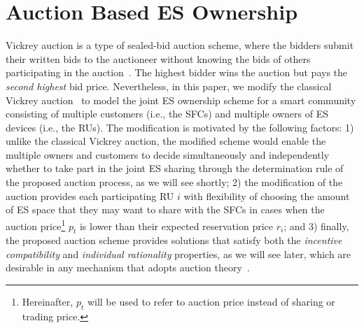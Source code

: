 \documentclass[journal,10pt]{IEEEtran}
\begin{document}
\section{Auction Based ES Ownership}\label{sec:auction-ownership}
Vickrey auction is a type of sealed-bid auction scheme, where the bidders submit their written bids to the auctioneer without knowing the bids of others participating in the auction~\cite{Vickrey-JF:1961}. The highest bidder wins the auction but pays the \emph{second highest} bid price. Nevertheless, in this paper, we modify the classical Vickrey auction~\cite{Vickrey-JF:1961} to model the joint ES ownership scheme for a smart community consisting of multiple customers (i.e., the SFCs) and multiple owners of ES devices (i.e., the RUs). The modification is motivated by the following factors: 1) unlike the classical Vickrey auction, the modified scheme would enable the multiple owners and customers to decide simultaneously and independently whether to take part in the joint ES sharing through the determination rule of the proposed auction process, as we will see shortly; 2) the modification of the auction provides each participating RU $i$ with flexibility of choosing the amount of ES space that they may want to share with the SFCs in cases when the auction price\footnote{Hereinafter, $p_t$ will be used to refer to auction price instead of sharing or trading price.} $p_t$ is lower than their expected reservation price $r_i$; and 3) finally, the proposed auction scheme provides solutions that satisfy both the \emph{incentive compatibility} and \emph{individual rationality} properties, as we will see later, which are desirable in any mechanism that adopts auction theory~\cite{Saad-CSmartgridComm:2011}.
\end{document}
